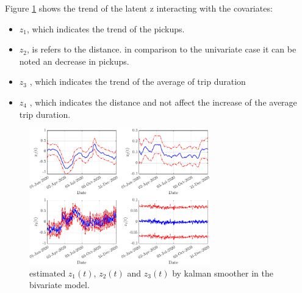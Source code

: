 \noindent
Figure \ref{Trend_zeta_latente} shows the trend of the latent z interacting with the covariates:
\begin{itemize}
	\item $z_{1}$, which indicates the trend of the pickups.
	\item $z_{2}$, is refers to the distance. in comparison to the univariate case it can be noted  an decrease in pickups.
	\item $z_{3}$ , which indicates the trend of the average of trip duration
	\item $z_{4}$ , which indicates the distance and not affect the increase of the average trip duration.
\end{itemize}

\begin{figure}
	\centering
	\includegraphics[height=222px]{Images/Data analysis/DCM/Trend_z_biv.pdf}
	\caption[Estimated $z_{1}(t)$,  $z_{2}(t)$ and $z_{3}(t)$ by Kalman smoother in the bivariate model (DCM)]{estimated $z_{1}(t)$,  $z_{2}(t)$ and $z_{3}(t)$ by kalman smoother in the bivariate model.}
	\label{Trend_zeta_latente}
\end{figure}

